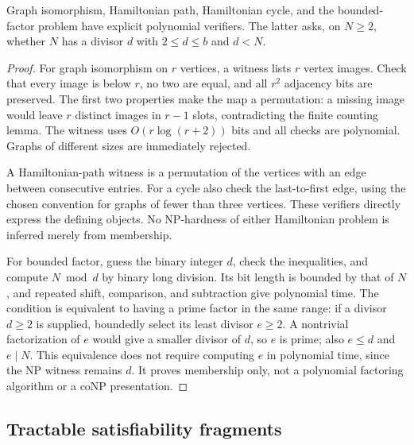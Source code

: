 \begin{theorem}\label{thm:N12}
Graph isomorphism, Hamiltonian path, Hamiltonian cycle, and the bounded-factor
problem have explicit polynomial verifiers. The latter asks, on $N\ge2$,
whether $N$ has a divisor $d$ with $2\le d\le b$ and $d<N$.
\end{theorem}
\begin{proof}
For graph isomorphism on $r$ vertices, a witness lists $r$ vertex images.
Check that every image is below $r$, no two are equal, and all $r^2$
adjacency bits are preserved. The first two properties make the map a
permutation: a missing image would leave $r$ distinct images in $r-1$ slots,
contradicting the finite counting lemma. The witness uses
$O(r\log(r+2))$ bits and all checks are polynomial. Graphs of different sizes
are immediately rejected.

A Hamiltonian-path witness is a permutation of the vertices with an edge
between consecutive entries. For a cycle also check the last-to-first edge,
using the chosen convention for graphs of fewer than three vertices. These
verifiers directly express the defining objects. No NP-hardness of either
Hamiltonian problem is inferred merely from membership.

For bounded factor, guess the binary integer $d$, check the inequalities, and
compute $N\bmod d$ by binary long division. Its bit length is bounded by that
of $N$, and repeated shift, comparison, and subtraction give polynomial time.
The condition is equivalent to having a prime factor in the same range:
if a divisor $d\ge2$ is supplied, boundedly select its least divisor
$e\ge2$. A nontrivial factorization of $e$ would give a smaller divisor of
$d$, so $e$ is prime; also $e\le d$ and $e\mid N$. This equivalence does not
require computing $e$ in polynomial time, since the NP witness remains $d$.
It proves membership only, not a polynomial factoring algorithm or a
coNP presentation.
\end{proof}

\subsection{Tractable satisfiability fragments}

